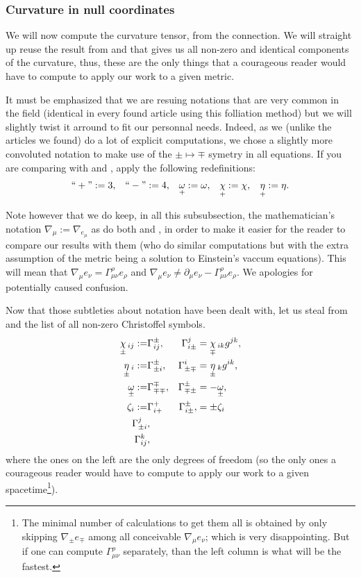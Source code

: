 \documentclass[a4paper,11pt]{article}
\numberwithin{equation}{section}
\theoremstyle{definition}
\begin{document}
\subsubsection{Curvature in null coordinates}
We will now compute the curvature tensor, from the connection. We will straight up reuse the result from \cite{Art} and \cite{Chris} that gives us all non-zero and identical components of the curvature, thus, these are the only things that a courageous reader would have to compute to apply our work to a given metric.

It must be emphasized that we are resuing notations that are very common in the field (identical in every found article using this folliation method) but we will slightly twist it arround to fit our personnal needs. Indeed, as we (unlike the articles we found) do a lot of explicit computations, we chose a slightly more convoluted notation to make use of the $\pm\mapsto\mp$ symetry in all equations. If you are comparing with \cite{Art} and \cite{Chris}, apply the following redefinitions:
\begin{align}
    ``+":=3, && ``-":=4, && \underset{+}{\omega}:=\omega, && \underset{+}{\chi}:=\chi, && \underset{+}{\eta}:=\eta.
\end{align}

Note however that we do keep, in all this subsubsection, the mathematician's notation $\nabla_\mu:=\nabla_{e_\mu}$ as do both \cite{Art} and \cite{Chris}, in order to make it easier for the reader to compare our results with them (who do similar computations but with the extra assumption of the metric being a solution to Einstein's vaccum equations). This will mean that $\nabla_\mu e_\nu = \Gamma_{\mu\nu}^\rho e_\rho$ and $\nabla_\mu e_\nu \ne \partial_\mu e_\nu - \Gamma_{\mu\nu}^\rho e_\rho$. We apologies for potentially caused confusion.

Now that those subtleties about notation have been dealt with, let us steal from \cite{Art} and \cite{Chris} the list of all non-zero Christoffel symbols.
\begin{align}
    \underset{\pm}{\chi}\,_{ij} :=&\Gamma_{ij}^\pm, &\Gamma_{i\pm}^j&=\underset{\mp}{\chi}\,_{ik}g^{jk}\notag,\\
    \underset{\pm}{\eta}\,_i :=&\Gamma_{\pm i}^\pm, &\Gamma_{\pm\mp}^i&=\underset{\pm}{\eta}\,_kg^{ik}\notag,\\
    \underset{\pm}{\omega}:=&\Gamma_{\mp\mp}^\mp, &\Gamma_{\mp\pm}^\pm&=-\underset{\pm}{\omega}\label{Christoffel},\\
    \zeta_i :=& \Gamma_{i+}^+ &\Gamma_{i\pm}^\pm,&=\pm\zeta_i \notag\\
    \Gamma_{\pm i}^j&\notag,\\
    \Gamma_{ij}^k&\notag,
\end{align}
where the ones on the left are the only degrees of freedom (so the only ones a courageous reader would have to compute to apply our work to a given spacetime\footnote{The minimal number of calculations to get them all is obtained by only skipping $\nabla_\pm e_\mp$ among all conceivable $\nabla_\mu e_\nu$; which is very disappointing. But if one can compute $\Gamma_{\mu\nu}^\rho$ separately, than the left column is what will be the fastest.}).
\end{document}
